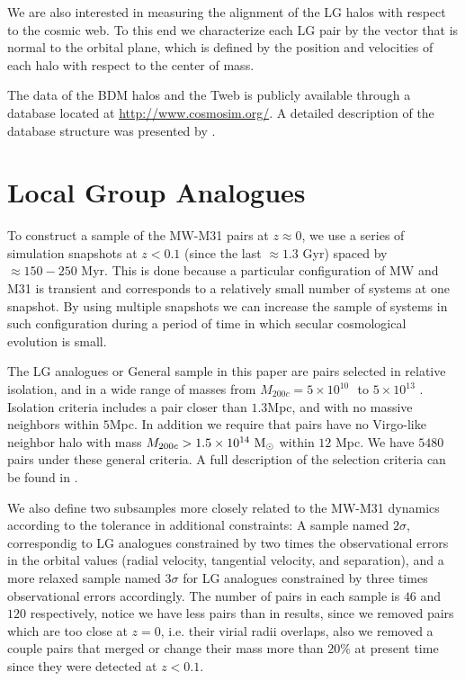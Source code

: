 \documentclass{emulateapj}
\newcommand{\mpc}{\rm{Mpc}}
\newcommand{\msun}{{\ifmmode{{\rm {M_{\odot}}}}\else{${\rm{M_{\odot}}}$}\fi}}
\begin{document}
We are also interested in measuring the alignment of the LG halos with
respect to the cosmic web. To this end we characterize each LG pair by
the vector that is normal to the orbital plane, which is defined by
the position and velocities of each halo with respect to the center of
mass. 

The data of the BDM halos and the Tweb is publicly available through
a database located at \url{http://www.cosmosim.org/}. A detailed
description of the database structure was presented by \cite{Riebe2013}.

\section{Local Group Analogues}
\label{sec:lg_analogues}

To construct a sample of the MW-M31 pairs at $z\approx 0$, we use a
series of simulation snapshots  at $z<0.1$ (since the last $\approx
1.3$ Gyr) spaced by $\approx 150-250$ Myr. This is done
because a particular configuration of MW and M31 is transient and
corresponds to a relatively small number of systems at one
snapshot. By using multiple snapshots we can increase the sample of
systems in such configuration during a period of time in which secular
cosmological evolution is small. 

The LG analogues or General sample in this paper are pairs selected in relative isolation,
and in a wide range of masses from  $M_{200c}=5 \times 10^{10}$ \msun $ $ to $ 5 \times 10^{13}$ \msun. 
Isolation criteria includes a pair closer than $1.3$\mpc, and with no massive neighbors within $5$\mpc.
In addition we require that pairs have no Virgo-like neighbor halo with mass $M_{200c}>1.5 \times 10^{14}\ \rm M_{\odot}$ within $12$ Mpc. 
We have $5480$ pairs under these general criteria.
A full description of the selection criteria can be found in \citet{lganalogues,sat}. 

We also define two subsamples more closely related to the MW-M31 
dynamics  according to the tolerance in additional constraints:
A sample named $2\sigma$, correspondig to LG analogues constrained by
two times the observational errors in the orbital values (radial
velocity, tangential velocity, and separation), and a more relaxed
sample named $3\sigma$ for LG analogues constrained by three times
observational errors accordingly. The number of pairs in each sample
is $46$ and $120$ respectively, notice we have less pairs than in
\citet{lganalogues} results, since we removed pairs which are too
close at $z=0$, i.e. their virial radii overlaps, also we removed a
couple pairs that merged or change their mass more than $20\%$ at
present time since they were detected at $z<0.1$.  
\end{document}

